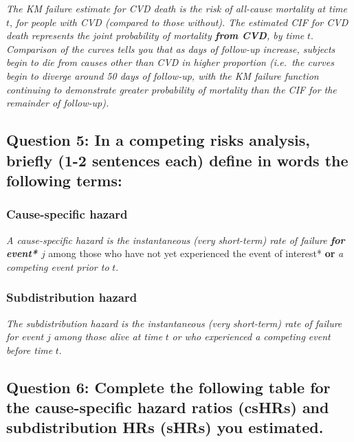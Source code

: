 \documentclass[]{article}
\begin{document}
\emph{The KM failure estimate for CVD death is the risk of all-cause
mortality at time} \(t\), \emph{for people with CVD (compared to those
without). The estimated CIF for CVD death represents the joint
probability of mortality \textbf{from CVD}, by time} \(t\).
\emph{Comparison of the curves tells you that as days of follow-up
increase, subjects begin to die from causes other than CVD in higher
proportion (i.e.~the curves begin to diverge around 50 days of
follow-up, with the KM failure function continuing to demonstrate
greater probability of mortality than the CIF for the remainder of
follow-up).}

\vspace{6pt}

\subsection{Question 5: In a competing risks analysis, briefly (1-2
sentences each) define in words the following
terms:}\label{question-5-in-a-competing-risks-analysis-briefly-1-2-sentences-each-define-in-words-the-following-terms}

\subsubsection{Cause-specific hazard}\label{cause-specific-hazard}

\emph{A cause-specific hazard is the instantaneous (very short-term)
rate of failure \textbf{for event* \(j\)} }among those who have not yet
experienced the event of interest* \textbf{or} \emph{a competing event
prior to} \(t\).

\vspace{6pt}

\subsubsection{Subdistribution hazard}\label{subdistribution-hazard}

\emph{The subdistribution hazard is the instantaneous (very short-term)
rate of failure for event} \(j\) \emph{among those alive at time} \(t\)
\emph{or who experienced a competing event before time} \(t\).

\vspace{12pt}

\subsection{Question 6: Complete the following table for the
cause-specific hazard ratios (csHRs) and subdistribution HRs (sHRs) you
estimated.}\label{question-6-complete-the-following-table-for-the-cause-specific-hazard-ratios-cshrs-and-subdistribution-hrs-shrs-you-estimated.}
\end{document}
